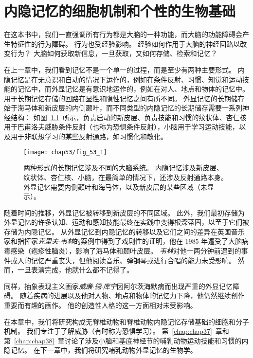 \chapter{内隐记忆的细胞机制和个性的生物基础} \label{chap:chap53}

在这本书中，我们一直强调所有行为都是大脑的一种功能，而大脑的功能障碍会产生特征性的行为障碍。
行为也受经验影响。
经验如何作用于大脑的神经回路以改变行为？
大脑如何获取新信息，一旦获取，又如何存储、检索和记忆？


在上一章中，我们看到记忆不是一个单一的过程，而是至少有两种主要形式。
内隐记忆是在无意识和自动的情况下运作的，例如在条件反射、习惯、知觉和运动技能的记忆中，而外显记忆是有意识地运作的，例如在对人、地点和物体的记忆中。
用于长期记忆存储的回路在显性和隐性记忆之间有所不同。
外显记忆的长期储存始于海马体和新皮层的内侧颞叶，而不同类型的内隐记忆的长期储存需要一系列神经结构：
如图~\ref{fig:53_1}~所示，负责启动的新皮层、负责技能和习惯的纹状体、杏仁核用于巴甫洛夫威胁条件反射（也称为恐惧条件反射），小脑用于学习运动技能，以及用于非联想学习的某些反射通路，如习惯化和敏化。


\begin{figure}[htbp]
	\centering
	\texttt{[image: chap53/fig\_53\_1]}
	\caption{两种形式的长期记忆涉及不同的大脑系统。
		内隐记忆涉及新皮层、纹状体、杏仁核、小脑，在最简单的情况下，还涉及反射通路本身。
		外显记忆需要内侧颞叶和海马体，以及新皮层的某些区域（未显示）。}
	\label{fig:53_1}
\end{figure}


随着时间的推移，外显记忆被转移到新皮层的不同区域。
此外，我们最初存储为外显记忆的许多认知、运动和感知技能最终在实践中变得根深蒂固，以至于它们被存储为内隐记忆。
从外显记忆到内隐记忆的转移以及它们之间的差异在英国音乐家和指挥家\textit{克里夫$\cdot$韦林}的案例中得到了戏剧性的证明，他在 1985 年遭受了大脑病毒感染（疱疹性脑炎），影响了海马体和颞叶皮层。
\textit{韦林}对他一两分钟前遇到的事件或人的记忆严重丧失，但他阅读音乐、弹钢琴或进行合唱的能力未受影响。
然而，一旦表演完成，他就什么都不记得了。


同样，抽象表现主义画家\textit{威廉$\cdot$德$\cdot$库宁}因阿尔茨海默病而出现严重的外显记忆障碍。
随着疾病的进展以及他对人物、地点和物体的记忆力下降，他仍然继续创作重要而有趣的画作。
他的创造性人格的这一方面相对未受影响。


在本章中，我们将研究构成无脊椎动物和脊椎动物内隐记忆存储基础的细胞和分子机制。
我们专注于了解威胁（有时称为恐惧学习）。
第~\ref{chap:chap37}~章和第~\ref{chap:chap38}~章讨论了涉及小脑和基底神经节的哺乳动物运动技能和习惯的内隐记忆。
在下一章中，我们将研究哺乳动物外显记忆的生物学。



